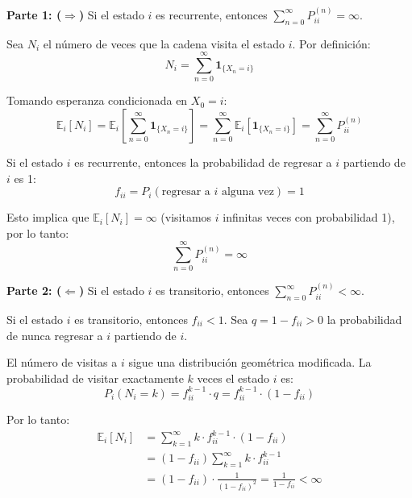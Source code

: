 \documentclass[12pt,a4paper]{article}
\begin{document}
\textbf{Parte 1: ($\Rightarrow$)} Si el estado $i$ es recurrente, entonces $\sum_{n=0}^{\infty} P_{ii}^{(n)} = \infty$.

Sea $N_i$ el número de veces que la cadena visita el estado $i$. Por definición:
\begin{equation*}
N_i = \sum_{n=0}^{\infty} \mathbf{1}_{\{X_n = i\}}
\end{equation*}

Tomando esperanza condicionada en $X_0 = i$:
\begin{equation*}
\mathbb{E}_i[N_i] = \mathbb{E}_i\left[\sum_{n=0}^{\infty} \mathbf{1}_{\{X_n = i\}}\right] = \sum_{n=0}^{\infty} \mathbb{E}_i[\mathbf{1}_{\{X_n = i\}}] = \sum_{n=0}^{\infty} P_{ii}^{(n)}
\end{equation*}

Si el estado $i$ es recurrente, entonces la probabilidad de regresar a $i$ partiendo de $i$ es 1:
\begin{equation*}
f_{ii} = P_i(\text{regresar a } i \text{ alguna vez}) = 1
\end{equation*}

Esto implica que $\mathbb{E}_i[N_i] = \infty$ (visitamos $i$ infinitas veces con probabilidad 1), por lo tanto:
\begin{equation*}
\sum_{n=0}^{\infty} P_{ii}^{(n)} = \infty
\end{equation*}

\textbf{Parte 2: ($\Leftarrow$)} Si el estado $i$ es transitorio, entonces $\sum_{n=0}^{\infty} P_{ii}^{(n)} < \infty$.

Si el estado $i$ es transitorio, entonces $f_{ii} < 1$. Sea $q = 1 - f_{ii} > 0$ la probabilidad de nunca regresar a $i$ partiendo de $i$.

El número de visitas a $i$ sigue una distribución geométrica modificada. La probabilidad de visitar exactamente $k$ veces el estado $i$ es:
\begin{equation*}
P_i(N_i = k) = f_{ii}^{k-1} \cdot q = f_{ii}^{k-1} \cdot (1 - f_{ii})
\end{equation*}

Por lo tanto:
\begin{align*}
\mathbb{E}_i[N_i] &= \sum_{k=1}^{\infty} k \cdot f_{ii}^{k-1} \cdot (1 - f_{ii}) \\
&= (1 - f_{ii}) \sum_{k=1}^{\infty} k \cdot f_{ii}^{k-1} \\
&= (1 - f_{ii}) \cdot \frac{1}{(1 - f_{ii})^2} = \frac{1}{1 - f_{ii}} < \infty
\end{align*}
\end{document}
